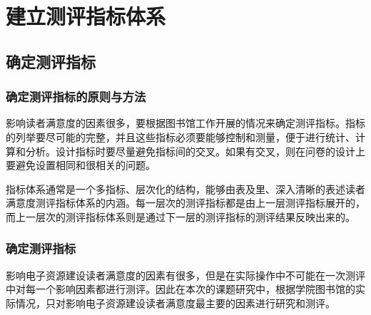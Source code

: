 \section{建立测评指标体系}
    \subsection{确定测评指标}
        \subsubsection{确定测评指标的原则与方法}
            影响读者满意度的因素很多，要根据图书馆工作开展的情况来确定测评指标。指标的列举要尽可能的完整，并且这些指标必须要能够控制和测量，便于进行统计、计算和分析。设计指标时要尽量避免指标间的交叉。如果有交叉，则在问卷的设计上要避免设置相同和很相关的问题。

            指标体系通常是一个多指标、层次化的结构，能够由表及里、深入清晰的表述读者满意度测评指标体系的内涵。每一层次的测评指标都是由上一层测评指标展开的，而上一层次的测评指标体系则是通过下一层的测评指标的测评结果反映出来的。
        \subsubsection{确定测评指标}
            影响电子资源建设读者满意度的因素有很多，但是在实际操作中不可能在一次测评中对每一个影响因素都进行测评。因此在本次的课题研究中，根据学院图书馆的实际情况，只对影响电子资源建设读者满意度最主要的因素进行研究和测评。
